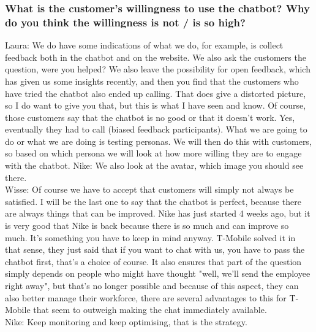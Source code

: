 \begin{appendices}
	\subsubsection{What is the customer's willingness to use the chatbot?
		Why do you think the willingness is not / is so high?}
	Laura: We do have some indications of what we do, for example, is collect feedback both in the chatbot and on the website. We also ask the customers the question, were you helped? We also leave the possibility for open feedback, which has given us some insights recently, and then you find that the customers who have tried the chatbot also ended up calling. That does give a distorted picture, so I do want to give you that, but this is what I have seen and know. Of course, those customers say that the chatbot is no good or that it doesn't work. Yes, eventually they had to call (biased feedback participants). What we are going to do or what we are doing is testing personas. We will then do this with customers, so based on which persona we will look at how more willing they are to engage with the chatbot. 
	Nike: We also look at the avatar, which image you should see there.\\
	\break
	Wisse: Of course we have to accept that customers will simply not always be satisfied. I will be the last one to say that the chatbot is perfect, because there are always things that can be improved. Nike has just started 4 weeks ago, but it is very good that Nike is back because there is so much and can improve so much. It's something you have to keep in mind anyway. T-Mobile solved it in that sense, they just said that if you want to chat with us, you have to pass the chatbot first, that's a choice of course. It also ensures that part of the question simply depends on people who might have thought "well, we'll send the employee right away", but that's no longer possible and because of this aspect, they can also better manage their workforce, there are several advantages to this for T-Mobile that seem to outweigh making the chat immediately available.\\ 
	\break
	Nike: Keep monitoring and keep optimising, that is the strategy.
	

\end{appendices}
